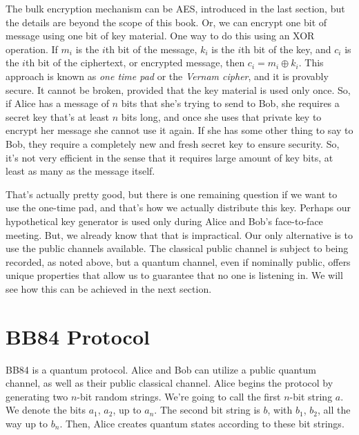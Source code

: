 The bulk encryption mechanism can be AES, introduced in the last section, but the details are beyond the scope of this book. Or, we can encrypt one bit of message using one bit of key material.  One way to do this using an XOR operation.  If $m_i$ is the $i$th bit of the message, $k_i$ is the $i$th bit of the key, and $c_i$ is the $i$th bit of the ciphertext, or encrypted message, then $c_i = m_i \oplus k_i$.  This approach is known as \emph{one time pad} or the \emph{Vernam cipher}, and it is provably secure. It cannot be broken, provided that the key material is used only once. So, if Alice has a message of $n$ bits that she's trying to send to Bob, she requires a secret key that's at least $n$ bits long, and once she uses that private key to encrypt her message she cannot use it again. If she has some other thing to say to Bob, they require a completely new and fresh secret key to ensure security. So, it's not very efficient in the sense that it requires large amount of key bits, at least as many as the message itself.

That's actually pretty good, but there is one remaining question if we want to use the one-time pad, and that's how we actually distribute this key.  Perhaps our hypothetical key generator is used only during Alice and Bob's face-to-face meeting.  But, we already know that that is impractical.  Our only alternative is to use the public channels available.  The classical public channel is subject to being recorded, as noted above, but a quantum channel, even if nominally public, offers unique properties that allow us to guarantee that no one is listening in.  We will see how this can be achieved in the next section.

\section{BB84 Protocol}
\label{sec:bb84-protocol}

BB84 is a quantum protocol.  Alice and Bob can utilize a public quantum channel, as well as their public classical channel.  Alice begins the protocol by generating two $n$-bit random strings. We're going to call the first $n$-bit string $a$.  We denote the bits $a_1$, $a_2$, up to $a_n$. The second bit string is $b$, with $b_1$, $b_2$, all the way up to $b_n$.  Then, Alice creates quantum states according to these bit strings.

